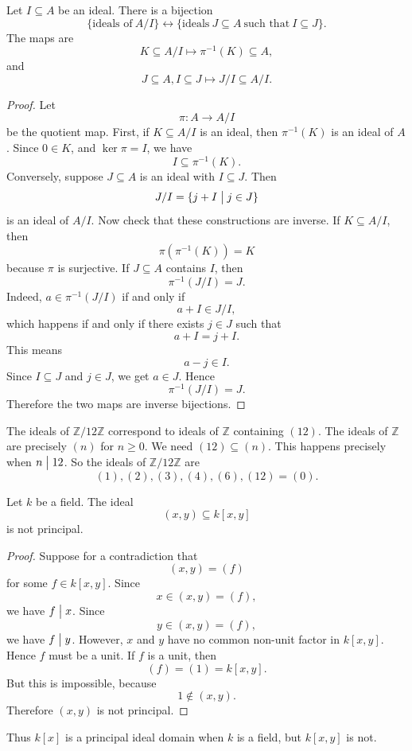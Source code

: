 \begin{thm}
    Let $I \subseteq A$ be an ideal. There is a bijection 
    \[
        \{\text{ideals of} \ A/I\} 
        \leftrightarrow \{\text{ideals} \ J 
        \subseteq A \ \text{such that} \ I \subseteq J\}. 
    \]
    The maps are 
    \[
        K \subseteq A/I \mapsto \pi^{-1}(K) \subseteq A, 
    \]
    and 
    \[
        J \subseteq A, I \subseteq J \mapsto 
        J/I \subseteq A/I. 
    \]
\end{thm}

\begin{proof}
    Let 
    \[
        \pi : A \to A/I
    \]
    be the quotient map. First, if $K \subseteq A/I$ is an ideal, 
    then $\pi^{-1}(K)$ is an ideal of $A$. Since $0 \in K$, and 
    $\ker \pi = I$, we have 
    \[
        I \subseteq \pi^{-1}(K).
    \]
    Conversely, suppose $J \subseteq A$ is an ideal with 
    $I \subseteq J$. Then 
    \[
        J/I = \{j + I \bigm | j \in J\}
    \]
    is an ideal of $A/I$. Now check that these constructions are 
    inverse. If $K \subseteq A/I$, then 
    \[
        \pi(\pi^{-1}(K)) = K
    \]
    because $\pi$ is surjective. If $J \subseteq A$ contains $I$, 
    then 
    \[
        \pi^{-1}(J/I) = J. 
    \]
    Indeed, $a \in \pi^{-1}(J/I)$ if and only if 
    \[
        a + I \in J/I, 
    \]
    which happens if and only if there exists $j \in J$ such that 
    \[
        a + I = j + I.
    \]
    This means 
    \[
        a - j \in I. 
    \]
    Since $I \subseteq J$ and $j \in J$, we get 
    $a \in J$. Hence 
    \[
        \pi^{-1}(J/I) = J. 
    \]
    Therefore the two maps are inverse bijections. 
\end{proof}
\begin{ex}
    The ideals of $\mathbb Z / 12 \mathbb Z$ correspond 
    to ideals of $\mathbb Z$ containing $(12)$. 
    The ideals of $\mathbb Z$ are precisely 
    $(n)$ for $n \geq 0$. We need 
    $(12) \subseteq (n)$. This happens precisely when 
    $n \bigm| 12$. So the ideals of $\mathbb Z/12\mathbb Z$ are 
    \[
        (1), (2), (3), (4), (6), (12) = (0). 
    \]
\end{ex}

\begin{prop}
    Let $k$ be a field. The ideal 
    \[
        (x,y) \subseteq k[x,y]
    \]
    is not principal. 
\end{prop}
\begin{proof}
    Suppose for a contradiction that 
    \[
        (x,y) = (f)
    \]
    for some $f \in k[x,y]$. 
    Since 
    \[
        x \in (x,y) = (f),
    \]
    we have $f \bigm| x$. Since 
    \[
        y \in (x,y) = (f), 
    \]
    we have $f \bigm| y$. However, $x$ and $y$ have no common 
    non-unit factor in $k[x,y]$. Hence $f$ must be a unit. If 
    $f$ is a unit, then 
    \[
        (f) = (1) = k[x,y].
    \]
    But this is impossible, because 
    \[
        1 \not\in (x,y). 
    \]
    Therefore $(x,y)$ is not principal. 
\end{proof}
Thus $k[x]$ is a principal ideal domain when $k$ is a field, 
but $k[x,y]$ is not. 

